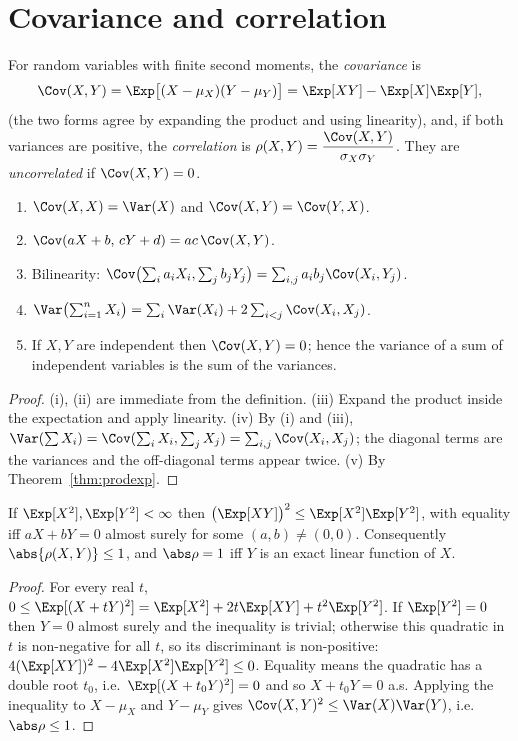 \section{Covariance and correlation}

\begin{definition}
For random variables with finite second moments, the \emph{covariance} is
\[
\Cov(X,Y)=\Exp\bigl[(X-\mu_X)(Y-\mu_Y)\bigr]=\Exp[XY]-\Exp[X]\Exp[Y],
\]
(the two forms agree by expanding the product and using linearity), and, if both
variances are positive, the \emph{correlation} is
$\rho(X,Y)=\dfrac{\Cov(X,Y)}{\sigma_X\sigma_Y}$. They are \emph{uncorrelated} if
$\Cov(X,Y)=0$.
\end{definition}

\begin{theorem}\label{thm:cov}
\begin{enumerate}[label=(\roman*)]
\item $\Cov(X,X)=\Var(X)$ and $\Cov(X,Y)=\Cov(Y,X)$.
\item $\Cov(aX+b,\,cY+d)=ac\,\Cov(X,Y)$.
\item Bilinearity: $\Cov\bigl(\sum_ia_iX_i,\sum_jb_jY_j\bigr)=\sum_{i,j}a_ib_j\Cov(X_i,Y_j)$.
\item $\Var\bigl(\sum_{i=1}^nX_i\bigr)=\sum_i\Var(X_i)+2\sum_{i<j}\Cov(X_i,X_j)$.
\item If $X,Y$ are independent then $\Cov(X,Y)=0$; hence the variance of a sum of
independent variables is the sum of the variances.
\end{enumerate}
\end{theorem}
\begin{proof}
(i), (ii) are immediate from the definition. (iii) Expand the product inside the
expectation and apply linearity. (iv) By (i) and (iii),
$\Var(\sum X_i)=\Cov(\sum_iX_i,\sum_jX_j)=\sum_{i,j}\Cov(X_i,X_j)$; the diagonal
terms are the variances and the off-diagonal terms appear twice. (v) By
Theorem~\ref{thm:prodexp}.
\end{proof}

\begin{theorem}\label{thm:cs}
If $\Exp[X^2],\Exp[Y^2]<\infty$ then $\bigl(\Exp[XY]\bigr)^2\le\Exp[X^2]\Exp[Y^2]$,
with equality iff $aX+bY=0$ almost surely for some $(a,b)\ne(0,0)$.
Consequently $\abs{\rho(X,Y)}\le1$, and $\abs\rho=1$ iff $Y$ is an exact linear
function of $X$.
\end{theorem}
\begin{proof}
For every real $t$, $0\le\Exp[(X+tY)^2]=\Exp[X^2]+2t\Exp[XY]+t^2\Exp[Y^2]$. If
$\Exp[Y^2]=0$ then $Y=0$ almost surely and the inequality is trivial; otherwise this
quadratic in $t$ is non-negative for all $t$, so its discriminant is
non-positive: $4(\Exp[XY])^2-4\Exp[X^2]\Exp[Y^2]\le0$. Equality means the
quadratic has a double root $t_0$, i.e.\ $\Exp[(X+t_0Y)^2]=0$ and so
$X+t_0Y=0$ a.s. Applying the inequality to $X-\mu_X$ and $Y-\mu_Y$ gives
$\Cov(X,Y)^2\le\Var(X)\Var(Y)$, i.e.\ $\abs\rho\le1$.
\end{proof}

